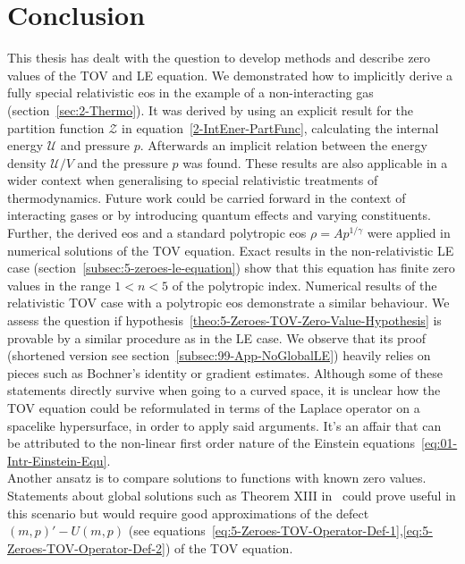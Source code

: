 \section{Conclusion}
\label{sec:80-Outlook}
This thesis has dealt with the question to develop methods and describe zero values of the \ac{TOV} and \ac{LE} equation.
We demonstrated how to implicitly derive a fully special relativistic \ac{eos} in the example of a non-interacting gas (section~\ref{sec:2-Thermo}).
It was derived by using an explicit result for the partition function $\mathcal{Z}$ in equation~\ref{2-IntEner-PartFunc}, calculating the internal energy $\mathcal{U}$ and pressure $p$.
Afterwards an implicit relation between the energy density $\mathcal{U}/V$ and the pressure $p$ was found.
These results are also applicable in a wider context when generalising to special relativistic treatments of thermodynamics.
Future work could be carried forward in the context of interacting gases or by introducing quantum effects and varying constituents.\\
Further, the derived \ac{eos} and a standard polytropic \ac{eos} $\rho=Ap^{1/\gamma}$ were applied in numerical solutions of the \ac{TOV} equation.
Exact results in the non-relativistic \ac{LE} case (section~\ref{subsec:5-zeroes-le-equation}) show that this equation has finite zero values in the range $1<n<5$ of the polytropic index.
Numerical results of the relativistic \ac{TOV} case with a polytropic \ac{eos} demonstrate a similar behaviour.
We assess the question if hypothesis~\ref{theo:5-Zeroes-TOV-Zero-Value-Hypothesis} is provable by a similar procedure as in the \ac{LE} case.
We observe that its proof~\cite{quittnerSuperlinearParabolicProblems2007} (shortened version see section~\ref{subsec:99-App-NoGlobalLE}) heavily relies on pieces such as Bochner's identity or gradient estimates.
Although some of these statements directly survive when going to a curved space, it is unclear how the \ac{TOV} equation could be reformulated in terms of the Laplace operator on a spacelike hypersurface, in order to apply said arguments.
It's an affair that can be attributed to the non-linear first order nature of the Einstein equations~\ref{eq:01-Intr-Einstein-Equ}.\\
Another ansatz is to compare solutions to functions with known zero values.
Statements about global solutions such as Theorem XIII in~\cite[p. 99]{walterOrdinaryDifferentialEquations1998} could prove useful in this scenario but would require good approximations of the defect $(m,p)'-U(m,p)$ (see equations~\ref{eq:5-Zeroes-TOV-Operator-Def-1},\ref{eq:5-Zeroes-TOV-Operator-Def-2}) of the \ac{TOV} equation.\\
